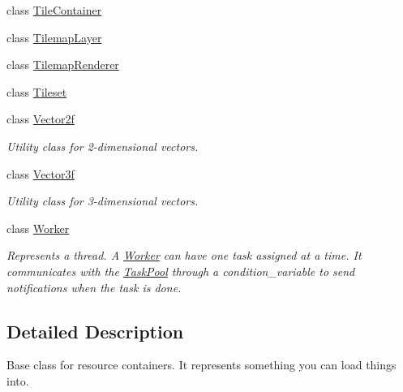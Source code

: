 \begin{DoxyCompactItemize}
class \hyperlink{classzt_1_1_tile_container}{Tile\+Container}
\item 
class \hyperlink{classzt_1_1_tilemap_layer}{Tilemap\+Layer}
\item 
class \hyperlink{classzt_1_1_tilemap_renderer}{Tilemap\+Renderer}
\item 
class \hyperlink{classzt_1_1_tileset}{Tileset}
\item 
class \hyperlink{classzt_1_1_vector2f}{Vector2f}
\begin{DoxyCompactList}\small\item\em Utility class for 2-\/dimensional vectors. \end{DoxyCompactList}\item 
class \hyperlink{classzt_1_1_vector3f}{Vector3f}
\begin{DoxyCompactList}\small\item\em Utility class for 3-\/dimensional vectors. \end{DoxyCompactList}\item 
class \hyperlink{classzt_1_1_worker}{Worker}
\begin{DoxyCompactList}\small\item\em Represents a thread. A \hyperlink{classzt_1_1_worker}{Worker} can have one task assigned at a time. It communicates with the \hyperlink{classzt_1_1_task_pool}{Task\+Pool} through a condition\+\_\+variable to send notifications when the task is done. \end{DoxyCompactList}\end{DoxyCompactItemize}


\subsection{Detailed Description}
Base class for resource containers. It represents something you can load things into. 